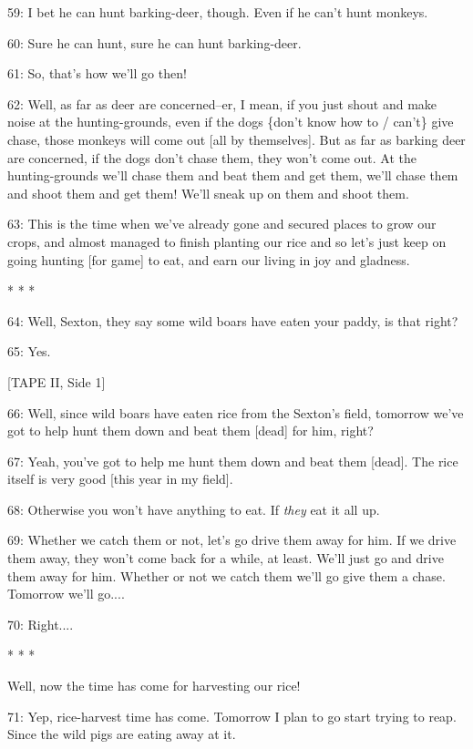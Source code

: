 59: I bet he can hunt barking-deer, though. Even if he can't hunt monkeys.

60: Sure he can hunt, sure he can hunt barking-deer.

61: So, that's how we'll go then!

62: Well, as far as deer are concerned--er, I mean, if you just shout and make
noise at the hunting-grounds, even if the dogs \{don't know how to / can't\} give
chase, those monkeys will come out [all by themselves]. But as far as barking deer
are concerned, if the dogs don't chase them, they won't come out. At the hunting-grounds
we'll chase them and beat them and get them, we'll chase them and shoot them and
get them! We'll sneak up on them and shoot them.

63: This is the time when we've already gone and secured places to grow our crops,
and almost managed to finish planting our rice and so let's just keep on going
hunting [for game] to eat, and earn our living in joy and gladness.

\begin{center}
* * *
\end{center}

\leftskip=0pt
64: Well, Sexton, they say some wild boars have eaten your paddy, is that right?

65: Yes.

[TAPE II, Side 1]

66: Well, since wild boars have eaten rice from the Sexton's field,  tomorrow we've
got to help hunt them down and beat them [dead] for him, right?

67: Yeah, you've got to help me hunt them down and beat them [dead]. The rice itself
is very good [this year in my field].

68: Otherwise you won't have anything to eat. If \textit{they} eat it all up.

69: Whether we catch them or not, let's go drive them away for him. If we drive
them away, they won't come back for a while, at least. We'll just go and drive
them away for him. Whether or not we catch them we'll go give them a chase. Tomorrow
we'll go....

70: Right....

\begin{center}
* * *
\end{center}

\leftskip=0pt
Well, now the time has come for harvesting our rice!

71: Yep, rice-harvest time has come. Tomorrow I plan to go start trying to reap.
Since the wild pigs are eating away at it.

